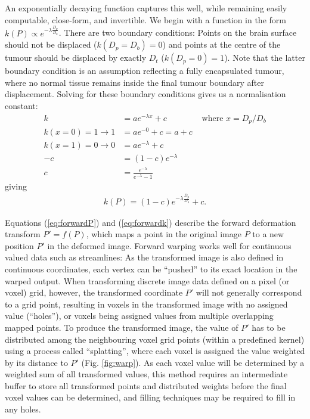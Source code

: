 An exponentially decaying function captures this well, while remaining easily computable, close-form, and invertible.
We begin with a function in the form $k(P) \propto e^{-\lambda \frac{D_p}{D_b}}$.
There are two boundary conditions:
Points on the brain surface should not be displaced ($k(D_p = D_b) = 0$) and points at the centre of the tumour should be displaced by exactly $D_t$ ($k(D_p = 0) = 1$).
Note that the latter boundary condition is an assumption reflecting a fully encapsulated tumour, where no normal tissue remains inside the final tumour boundary after displacement.
Solving for these boundary conditions gives us a normalisation constant:
\begin{align}
  k &= a e^{-\lambda x} + c &\text{ where } x = D_p / D_b \nonumber \\
  k(x=0)=1 \longrightarrow 1 &= a e^{-0} + c = a + c \nonumber \\
  k(x=1)=0 \longrightarrow 0 &= a e^{-\lambda} + c \nonumber \\
  -c &= (1-c) e^{-\lambda} \nonumber \\
  c &= \frac{e^{-\lambda}}{e^{-\lambda} - 1} \label{eq:c}
\end{align}
giving
\begin{align}\label{eq:forwardk}
  k(P) = (1-c)e^{-\lambda \frac{D_p}{D_b}} +c.
\end{align}

Equations (\ref{eq:forwardP}) and (\ref{eq:forwardk}) describe the forward deformation transform $P'=f(P)$, which maps a point in the original image $P$ to a new position $P'$ in the deformed image.
Forward warping works well for continuous valued data such as streamlines:
As the transformed image is also defined in continuous coordinates, each vertex can be ``pushed'' to its exact location in the warped output.
When transforming discrete image data defined on a pixel (or voxel) grid, however, the transformed coordinate $P'$ will not generally correspond to a grid point, resulting in voxels in the transformed image with no assigned value (``holes''), or voxels being assigned values from multiple overlapping mapped points.
To produce the transformed image, the value of $P'$ has to be distributed among the neighbouring voxel grid points (within a predefined kernel) using a process called ``splatting''\autocite{Niklaus2020}, where each voxel is assigned the value weighted by its distance to $P'$ (Fig. \ref{fig:warp}).
As each voxel value will be determined by a weighted sum of all transformed values, this method requires an intermediate buffer to store all transformed points and distributed weights before the final voxel values can be determined, and filling techniques may be required to fill in any holes.

